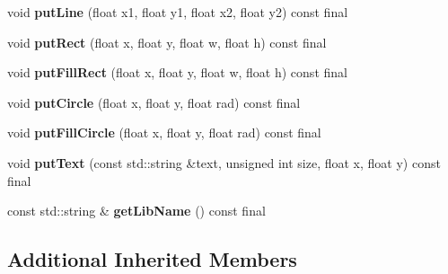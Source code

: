 \begin{DoxyCompactItemize}
\item 
\mbox{\label{classArcade_1_1Display_1_1Libcaca_ab3dfb33242807ae65707f8396db171cf}} 
void {\bfseries put\+Line} (float x1, float y1, float x2, float y2) const final
\item 
\mbox{\label{classArcade_1_1Display_1_1Libcaca_a740ea092d0df2e07478fafb6bff8122a}} 
void {\bfseries put\+Rect} (float x, float y, float w, float h) const final
\item 
\mbox{\label{classArcade_1_1Display_1_1Libcaca_ae07479000ed6c518053cd593a4aba092}} 
void {\bfseries put\+Fill\+Rect} (float x, float y, float w, float h) const final
\item 
\mbox{\label{classArcade_1_1Display_1_1Libcaca_a1a718ada53339b195c532fa52600e164}} 
void {\bfseries put\+Circle} (float x, float y, float rad) const final
\item 
\mbox{\label{classArcade_1_1Display_1_1Libcaca_aab9a63f5507cd00121c3b91c7ca15aa3}} 
void {\bfseries put\+Fill\+Circle} (float x, float y, float rad) const final
\item 
\mbox{\label{classArcade_1_1Display_1_1Libcaca_a2d4198dc8e383672ac00114d10b11e01}} 
void {\bfseries put\+Text} (const std\+::string \&text, unsigned int size, float x, float y) const final
\item 
\mbox{\label{classArcade_1_1Display_1_1Libcaca_a26e6dd02a853963fdcb812bddb3dee1e}} 
const std\+::string \& {\bfseries get\+Lib\+Name} () const final
\end{DoxyCompactItemize}
\subsection*{Additional Inherited Members}
